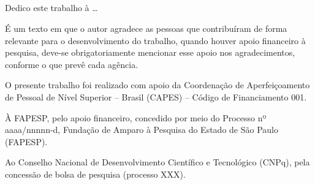 \begin{folhadeaprovacao}
		\vspace*{1cm}
		
		\raggedright\makebox[2.5in]{\hrulefill}\\
		\tituloDoMembroC\ \nomeDoMembroC \\ \instituicaomembroC
		
		\vspace*{1cm}
		
		\raggedright\makebox[2.5in]{\hrulefill}\\
		\tituloDoMembroD\ \nomeDoMembroD \\ \instituicaomembroD
		
	\end{folhadeaprovacao}
	
	
	
	\begin{dedicatoria}
		\vspace*{\fill}
		\begin{flushright}
			Dedico este trabalho à … 
		\end{flushright}
		\vspace*{1cm}
	\end{dedicatoria}
	
	\begin{agradecimentos}
		
		É um texto em que o autor agradece as pessoas que contribuíram de forma relevante para o desenvolvimento do trabalho, quando houver apoio financeiro à pesquisa, deve-se obrigatoriamente mencionar esse apoio nos agradecimentos, conforme o que prevê cada agência.
		
		O presente trabalho foi realizado com apoio da Coordenação de Aperfeiçoamento de Pessoal de Nível Superior – Brasil (CAPES) – Código de Financiamento 001.
		
		À FAPESP, pelo apoio financeiro, concedido por meio do Processo nº aaaa/nnnnn-d, Fundação de Amparo à Pesquisa do Estado de São Paulo (FAPESP).
		
		Ao Conselho Nacional de Desenvolvimento Científico e Tecnológico (CNPq), pela concessão de bolsa de pesquisa (processo XXX).
		
		
	\end{agradecimentos}
	
